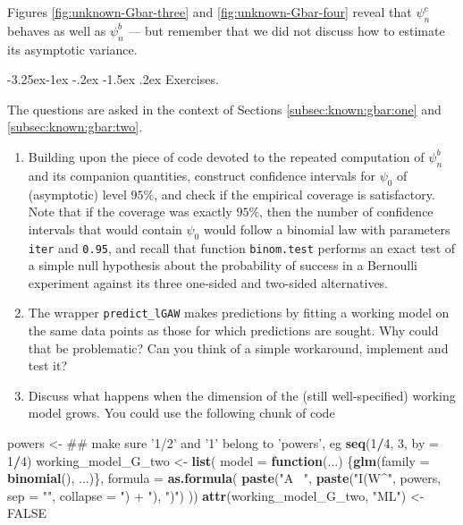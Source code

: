 \documentclass[]{article}
\makeatletter
\newenvironment{Shaded}{\begin{snugshade}}{\end{snugshade}}
\newcommand{\ControlFlowTok}[1]{\textcolor[rgb]{0.13,0.29,0.53}{\textbf{#1}}}
\newcommand{\DataTypeTok}[1]{\textcolor[rgb]{0.13,0.29,0.53}{#1}}
\newcommand{\DecValTok}[1]{\textcolor[rgb]{0.00,0.00,0.81}{#1}}
\newcommand{\KeywordTok}[1]{\textcolor[rgb]{0.13,0.29,0.53}{\textbf{#1}}}
\newcommand{\NormalTok}[1]{#1}
\newcommand{\OperatorTok}[1]{\textcolor[rgb]{0.81,0.36,0.00}{\textbf{#1}}}
\newcommand{\OtherTok}[1]{\textcolor[rgb]{0.56,0.35,0.01}{#1}}
\newcommand{\StringTok}[1]{\textcolor[rgb]{0.31,0.60,0.02}{#1}}
\renewcommand\subsection{\@startsection{subsection}{3}{\z@}%
                                     {-3.25ex\@plus -1ex \@minus -.2ex}%
                                     {-1.5ex \@plus .2ex}%
                                     {\normalfont\normalsize\bfseries}}
\newcommand{\gear}{\usebox{\gearbox}\;}
\theoremstyle{definition}
\theoremstyle{definition}
\theoremstyle{definition}
\theoremstyle{remark}
\makeatother
\begin{document}
Figures \ref{fig:unknown-Gbar-three} and \ref{fig:unknown-Gbar-four}
reveal that \(\psi_{n}^{c}\) behaves as well as \(\psi_{n}^{b}\) --- but
remember that we did not discuss how to estimate its asymptotic
variance.

\subsection{\gear Exercises.}
\label{subsec:exo:one}

The questions are asked in the context of Sections
\ref{subsec:known:gbar:one} and \ref{subsec:known:gbar:two}.

\begin{enumerate}
\def\labelenumi{\arabic{enumi}.}
\item
  Building upon the piece of code devoted to the repeated computation of
  \(\psi_{n}^{b}\) and its companion quantities, construct confidence
  intervals for \(\psi_{0}\) of (asymptotic) level \(95\%\), and check
  if the empirical coverage is satisfactory. Note that if the coverage
  was exactly \(95\%\), then the number of confidence intervals that
  would contain \(\psi_{0}\) would follow a binomial law with parameters
  \texttt{iter} and \texttt{0.95}, and recall that function
  \texttt{binom.test} performs an exact test of a simple null hypothesis
  about the probability of success in a Bernoulli experiment against its
  three one-sided and two-sided alternatives.
\item
  The wrapper \texttt{predict\_lGAW} makes predictions by fitting a
  working model on the same data points as those for which predictions
  are sought. Why could that be problematic? Can you think of a simple
  workaround, implement and test it?
\item
  Discuss what happens when the dimension of the (still well-specified)
  working model grows. You could use the following chunk of code
\end{enumerate}

\begin{Shaded}
\begin{Highlighting}[]
\NormalTok{powers <-}\StringTok{ }\NormalTok{## make sure '1/2' and '1' belong to 'powers', eg}
\StringTok{  }\KeywordTok{seq}\NormalTok{(}\DecValTok{1}\OperatorTok{/}\DecValTok{4}\NormalTok{, }\DecValTok{3}\NormalTok{, }\DataTypeTok{by =} \DecValTok{1}\OperatorTok{/}\DecValTok{4}\NormalTok{)}
\NormalTok{working_model_G_two <-}\StringTok{ }\KeywordTok{list}\NormalTok{(}
  \DataTypeTok{model =} \ControlFlowTok{function}\NormalTok{(...) \{}\KeywordTok{glm}\NormalTok{(}\DataTypeTok{family =} \KeywordTok{binomial}\NormalTok{(), ...)\},}
  \DataTypeTok{formula =} \KeywordTok{as.formula}\NormalTok{(}
    \KeywordTok{paste}\NormalTok{(}\StringTok{"A ~"}\NormalTok{,}
          \KeywordTok{paste}\NormalTok{(}\StringTok{"I(W^"}\NormalTok{, powers, }\DataTypeTok{sep =} \StringTok{""}\NormalTok{, }\DataTypeTok{collapse =} \StringTok{") + "}\NormalTok{),}
          \StringTok{")"}\NormalTok{)}
\NormalTok{  ))}
\KeywordTok{attr}\NormalTok{(working_model_G_two, }\StringTok{"ML"}\NormalTok{) <-}\StringTok{ }\OtherTok{FALSE}
\end{Highlighting}
\end{Shaded}
\end{document}
